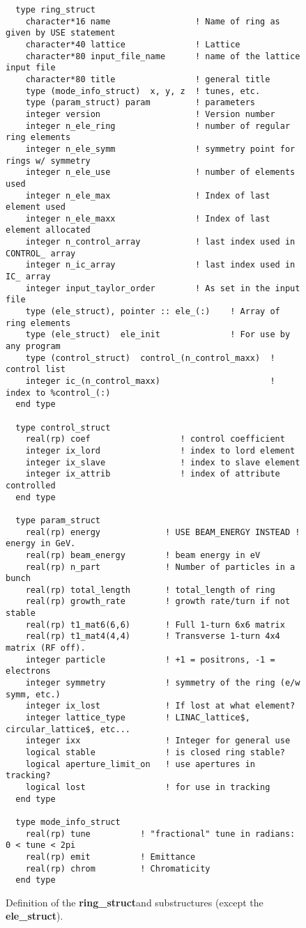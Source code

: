 \documentclass{book}
\newcommand{\ringstruct}{{\bf ring\_struct}}
\newcommand{\elestruct}{{\bf ele\_struct}}
\begin{document}
\begin{figure}[tb]
\centering
\begin{verbatim}
  type ring_struct
    character*16 name                 ! Name of ring as given by USE statement
    character*40 lattice              ! Lattice
    character*80 input_file_name      ! name of the lattice input file
    character*80 title                ! general title
    type (mode_info_struct)  x, y, z  ! tunes, etc.
    type (param_struct) param         ! parameters
    integer version                   ! Version number
    integer n_ele_ring                ! number of regular ring elements
    integer n_ele_symm                ! symmetry point for rings w/ symmetry
    integer n_ele_use                 ! number of elements used
    integer n_ele_max                 ! Index of last element used
    integer n_ele_maxx                ! Index of last element allocated
    integer n_control_array           ! last index used in CONTROL_ array
    integer n_ic_array                ! last index used in IC_ array
    integer input_taylor_order        ! As set in the input file
    type (ele_struct), pointer :: ele_(:)    ! Array of ring elements
    type (ele_struct)  ele_init              ! For use by any program
    type (control_struct)  control_(n_control_maxx)  ! control list
    integer ic_(n_control_maxx)                      ! index to %control_(:)
  end type

  type control_struct
    real(rp) coef                  ! control coefficient
    integer ix_lord                ! index to lord element
    integer ix_slave               ! index to slave element
    integer ix_attrib              ! index of attribute controlled
  end type

  type param_struct
    real(rp) energy             ! USE BEAM_ENERGY INSTEAD ! energy in GeV.
    real(rp) beam_energy        ! beam energy in eV
    real(rp) n_part             ! Number of particles in a bunch
    real(rp) total_length       ! total_length of ring
    real(rp) growth_rate        ! growth rate/turn if not stable
    real(rp) t1_mat6(6,6)       ! Full 1-turn 6x6 matrix
    real(rp) t1_mat4(4,4)       ! Transverse 1-turn 4x4 matrix (RF off).
    integer particle            ! +1 = positrons, -1 = electrons
    integer symmetry            ! symmetry of the ring (e/w symm, etc.)
    integer ix_lost             ! If lost at what element?
    integer lattice_type        ! LINAC_lattice$, circular_lattice$, etc...
    integer ixx                 ! Integer for general use
    logical stable              ! is closed ring stable?
    logical aperture_limit_on   ! use apertures in tracking?
    logical lost                ! for use in tracking
  end type

  type mode_info_struct
    real(rp) tune          ! "fractional" tune in radians: 0 < tune < 2pi
    real(rp) emit          ! Emittance
    real(rp) chrom         ! Chromaticity
  end type
\end{verbatim}
\caption{Definition of the \ringstruct and substructures 
(except the \elestruct).}
\label{fig:ring_struct}
\end{figure}
\end{document}
